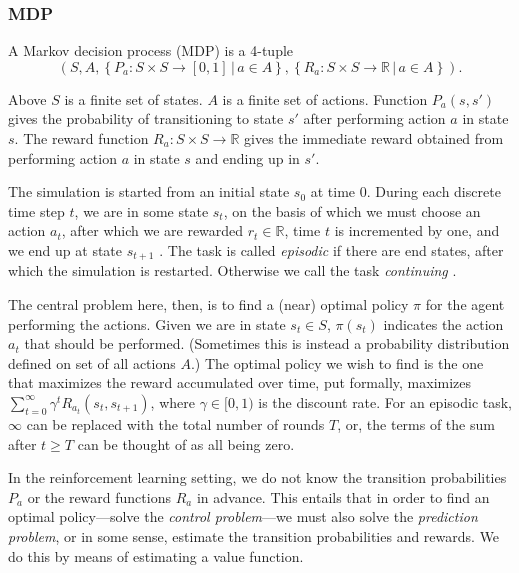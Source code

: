 \documentclass{article} %
\newcommand{\setof}[1]{\ensuremath{\left \{ #1 \right \}}}
\begin{document}
\subsubsection{MDP}

A Markov decision process (MDP) \cite{book} is a 4-tuple
\begin{equation}
  (S, A, \setof{P_a : S \times S \rightarrow [0,1] \,|\, a \in A},
  \setof{R_a : S \times S \rightarrow \mathbb{R} \,|\, a \in A}).
\end{equation}

Above $S$ is a finite set of states. $A$ is a finite set of actions. Function
$P_a(s, s')$ gives the probability of transitioning to state $s'$ after
performing action $a$ in state $s$. The reward function $R_a : S \times S
\rightarrow \mathbb{R}$ gives the immediate reward obtained from performing
action $a$ in state $s$ and ending up in $s'$.

The simulation is started from an initial state $s_0$ at time 0. During each
discrete time step $t$, we are in some state $s_t$, on the basis of which we
must choose an action $a_t$, after which we are rewarded $r_t \in \mathbb{R}$,
time $t$ is incremented by one, and we end up at state $s_{t+1}$
\cite{abe2002empirical}. The task is called \emph{episodic} if there are end
states, after which the simulation is restarted. Otherwise we call the task
\emph{continuing} \cite{book}.

The central problem here, then, is to find a (near) optimal policy $\pi$ for
the agent performing the actions. Given we are in state $s_t \in S$, $\pi(s_t)$
indicates the action $a_t$ that should be performed. (Sometimes this is instead
a probability distribution defined on set of all actions $A$.) The optimal
policy we wish to find is the one that maximizes the reward accumulated over
time, put formally, maximizes $\sum_{t=0}^\infty \gamma^t R_{a_t}(s_t,
s_{t+1})$, where $\gamma \in [0,1)$ is the discount rate. For an episodic task,
$\infty$ can be replaced with the total number of rounds $T$, or, the terms of
the sum after $t \geq T$ can be thought of as all being zero.

In the reinforcement learning setting, we do not know the transition
probabilities $P_a$ or the reward functions $R_a$ in advance. This entails that
in order to find an optimal policy---solve the \emph{control problem}---we
must also solve the \emph{prediction problem}, or in some sense, estimate the
transition probabilities and rewards. We do this by means of estimating a value
function.
\end{document}
